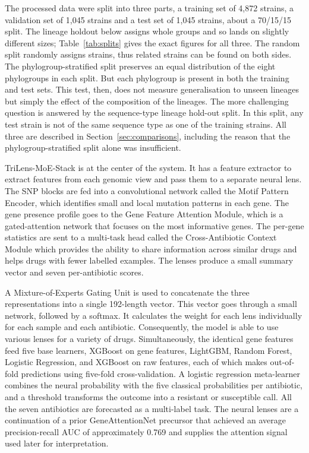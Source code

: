 The processed data were split into three parts, a training set of 4{,}872 strains, a validation set of 1{,}045 strains and a test set of 1{,}045 strains, about a 70/15/15 split. The lineage holdout below assigns whole groups and so lands on slightly different sizes; Table~\ref{tab:splits} gives the exact figures for all three. The random split randomly assigns strains, thus related strains can be found on both sides. The phylogroup-stratified split preserves an equal distribution of the eight phylogroups in each split. But each phylogroup is present in both the training and test sets. This test, then, does not measure generalisation to unseen lineages but simply the effect of the composition of the lineages. The more challenging question is answered by the sequence-type lineage hold-out split. In this split, any test strain is not of the same sequence type as one of the training strains. All three are described in Section~\ref{sec:comparisons}, including the reason that the phylogroup-stratified split alone was insufficient.

TriLens-MoE-Stack is at the center of the system. It has a feature extractor to extract features from each genomic view and pass them to a separate neural lens. The SNP blocks are fed into a convolutional network called the Motif Pattern Encoder, which identifies small and local mutation patterns in each gene. The gene presence profile goes to the Gene Feature Attention Module, which is a gated-attention network that focuses on the most informative genes. The per-gene statistics are sent to a multi-task head called the Cross-Antibiotic Context Module which provides the ability to share information across similar drugs and helps drugs with fewer labelled examples. The lenses produce a small summary vector and seven per-antibiotic scores.

A Mixture-of-Experts Gating Unit is used to concatenate the three representations into a single 192-length vector. This vector goes through a small network, followed by a softmax. It calculates the weight for each lens individually for each sample and each antibiotic. Consequently, the model is able to use various lenses for a variety of drugs. Simultaneously, the identical gene features feed five base learners, XGBoost on gene features, LightGBM, Random Forest, Logistic Regression, and XGBoost on raw features, each of which makes out-of-fold predictions using five-fold cross-validation. A logistic regression meta-learner combines the neural probability with the five classical probabilities per antibiotic, and a threshold transforms the outcome into a resistant or susceptible call. All the seven antibiotics are forecasted as a multi-label task. The neural lenses are a continuation of a prior GeneAttentionNet precursor that achieved an average precision-recall AUC of approximately 0.769 and supplies the attention signal used later for interpretation.

